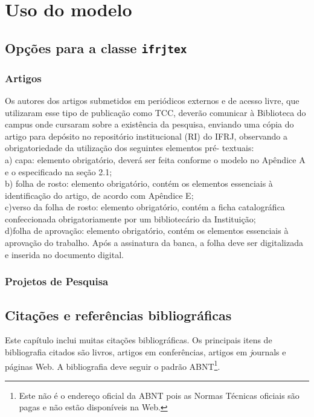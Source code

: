 %
%
\chapter{Uso do modelo}

\section{Opções para a classe \texttt{ifrjtex}}

\subsection{Artigos}


\begin{citacao}
Os autores dos artigos submetidos em periódicos externos e de acesso livre, que utilizaram esse tipo de publicação como TCC, deverão comunicar à
Biblioteca do campus onde cursaram sobre a existência da pesquisa, enviando uma cópia do artigo para depósito no repositório institucional (RI) do IFRJ, observando a obrigatoriedade da utilização dos seguintes elementos pré- textuais:\\
    a) capa: elemento obrigatório, deverá ser feita conforme o modelo no Apêndice A e o especificado na seção 2.1;\\
    b) folha de rosto: elemento obrigatório, contém os elementos essenciais à identificação do artigo, de acordo com Apêndice E;\\
   c)verso da folha de rosto: elemento obrigatório, contém a ficha catalográfica confeccionada obrigatoriamente por um bibliotecário da Instituição;\\
    d)folha de aprovação: elemento obrigatório, contém os elementos essenciais à aprovação do trabalho. Após a assinatura da banca, a folha deve ser digitalizada e inserida no documento digital. \cite{ifrjtccs}
\end{citacao}


\subsection{Projetos de Pesquisa}


\section{Citações e referências bibliográficas}

Este capítulo inclui muitas citações bibliográficas. Os principais
itens de bibliografia citados são livros, artigos em conferências,
artigos em {\textit journals} e páginas Web. A bibliografia deve seguir o
padrão ABNT\footnote{Este não é o endereço oficial da
ABNT pois as Normas Técnicas oficiais são pagas e não estão disponíveis na Web.}.

